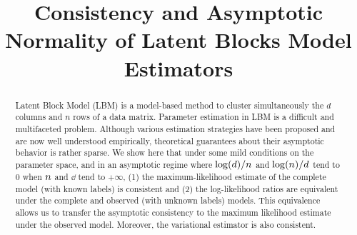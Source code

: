 \documentclass[bj]{imsart}
\numberwithin{equation}{section}
\theoremstyle{plain}
\theoremstyle{remark}
\begin{document}
\begin{frontmatter}
\title{Consistency and Asymptotic Normality of Latent Blocks Model Estimators}


\begin{abstract}
Latent Block Model (LBM) is a model-based method to cluster simultaneously the $d$ columns and $n$ rows of a data matrix. Parameter estimation in LBM is a difficult and multifaceted problem. Although various estimation strategies have been proposed and are now well understood empirically, theoretical guarantees about their asymptotic behavior is rather sparse. We show here that under some mild conditions on the parameter space, and in an asymptotic regime where $\log(d)/n$ and $\log(n)/d$ tend to $0$ when $n$ and $\dd$ tend to $+\infty$, (1) the maximum-likelihood estimate of the complete model (with known labels) is consistent and (2) the log-likelihood ratios are equivalent under the complete and observed (with unknown labels) models. This equivalence allows us to transfer the asymptotic consistency to the maximum likelihood estimate under the observed model. Moreover, the variational estimator is also consistent. 
\end{abstract}

\begin{keyword}
 
\end{keyword}

\end{frontmatter}
\end{document}
